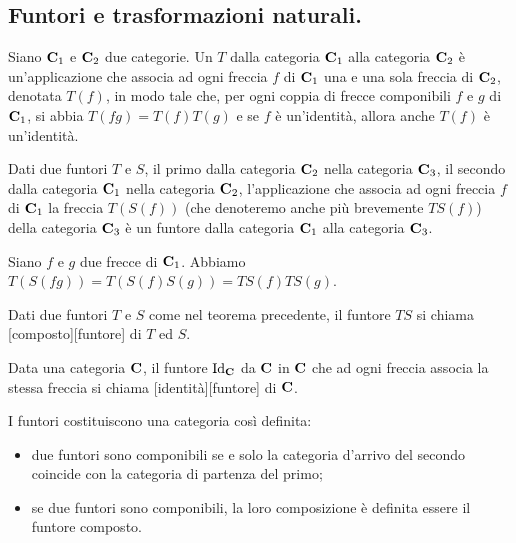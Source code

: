 \subsection{Funtori e trasformazioni naturali.}\label{FuntoriETrasformazioniNaturali}
\begin{Definition}
	Siano $\mathbf{C}_1$ e $\mathbf{C}_2$ due categorie. Un  $T$ dalla categoria $\mathbf{C}_1$ alla categoria $\mathbf{C}_2$ \`e un'applicazione che associa ad ogni freccia $f$ di $\mathbf{C}_1$ una e una sola freccia di $\mathbf{C}_2$, denotata $T(f)$, in modo tale che, per ogni coppia di frecce componibili $f$ e $g$ di $\mathbf{C}_1$, si abbia $T(fg) = T(f)T(g)$ e se $f$ \`e un'identit\`a, allora anche $T(f)$ \`e un'identit\`a.
\end{Definition}
\begin{Theorem}
	Dati due funtori $T$ e $S$, il primo dalla categoria $\mathbf{C}_2$ nella categoria $\mathbf{C}_3$, il secondo dalla categoria $\mathbf{C}_1$ nella categoria $\mathbf{C}_2$, l'applicazione che associa ad ogni freccia $f$ di $\mathbf{C}_1$ la freccia $T(S(f))$ (che denoteremo anche pi\`u brevemente $TS(f)$) della categoria $\mathbf{C}_3$ \`e un funtore dalla categoria $\mathbf{C}_1$ alla categoria $\mathbf{C}_3$.
\end{Theorem}
\Proof Siano $f$ e $g$ due frecce di $\mathbf{C}_1$. Abbiamo $T(S(fg)) = T(S(f)S(g)) = TS(f)TS(g)$. \EndProof
\begin{Definition}
	Dati due funtori $T$ e $S$ come nel teorema precedente, il funtore $TS$ si chiama [composto][funtore] di $T$ ed $S$.
\end{Definition}
\begin{Definition}
	Data una categoria $\mathbf{C}$, il funtore $\operatorname{Id}_{\mathbf{C}}$ da $\mathbf{C}$ in $\mathbf{C}$ che ad ogni freccia associa la stessa freccia si chiama [identit\`a][funtore] di $\mathbf{C}$.
\end{Definition}
\begin{Theorem}
	I funtori costituiscono una categoria cos\`i definita:
	\begin{itemize}
		\item due funtori sono componibili se e solo la categoria d'arrivo del secondo coincide con la categoria di partenza del primo;
		\item se due funtori sono componibili, la loro composizione \`e definita essere il funtore composto.
	\end{itemize}
\end{Theorem}
